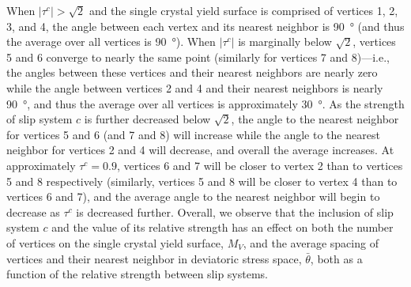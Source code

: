 \documentclass[preprint,3p,times,sort&compress,letterpaper,12pt]{elsarticle} %
\begin{document}
When $\left|\tau^c\right|>\sqrt{2}$ and the single crystal yield surface is comprised of vertices 1, 2, 3, and 4, the angle between each vertex and its nearest neighbor is \SI{90}{\degree} (and thus the average over all vertices is \SI{90}{\degree}). When $\left|\tau^c\right|$ is marginally below $\sqrt{2}$, vertices 5 and 6 converge to nearly the same point (similarly for vertices 7 and 8)---i.e., the angles between these vertices and their nearest neighbors are nearly zero while the angle between vertices 2 and 4 and their nearest neighbors is nearly \SI{90}{\degree}, and thus the average over all vertices is approximately \SI{30}{\degree}. As the strength of slip system $c$ is further decreased below $\sqrt{2}$, the angle to the nearest neighbor for vertices 5 and 6 (and 7 and 8) will increase while the angle to the nearest neighbor for vertices 2 and 4 will decrease, and overall the average increases. At approximately $\tau^c=0.9$, vertices 6 and 7 will be closer to vertex 2 than to vertices 5 and 8 respectively (similarly, vertices 5 and 8 will be closer to vertex 4 than to vertices 6 and 7), and the average angle to the nearest neighbor will begin to decrease as $\tau^c$ is decreased further. Overall, we observe that the inclusion of slip system $c$ and the value of its relative strength has an effect on both the number of vertices on the single crystal yield surface, $M_V$, and the average spacing of vertices and their nearest neighbor in deviatoric stress space, $\bar{\theta}$, both as a function of the relative strength between slip systems.
\end{document}
